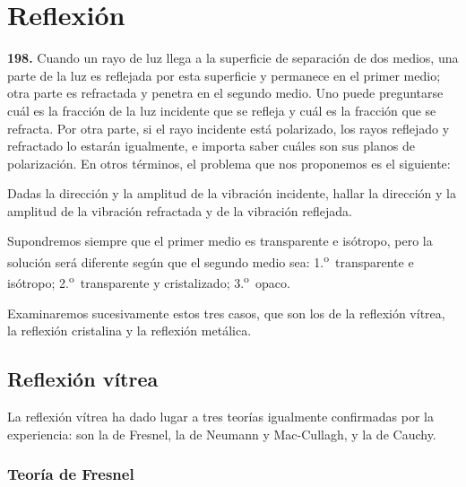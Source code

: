 \chapter{Reflexión}
\label{cap:reflexion}

\noindent\textbf{198.} Cuando un rayo de luz llega a la superficie de
separación de dos medios, una parte de la luz es reflejada por esta
superficie y permanece en el primer medio; otra parte es refractada y
penetra en el segundo medio. Uno puede preguntarse cuál es la fracción de
la luz incidente que se refleja y cuál es la fracción que se refracta. Por
otra parte, si el rayo incidente está polarizado, los rayos reflejado y
refractado lo estarán igualmente, e importa saber cuáles son sus planos de
polarización. En otros términos, el problema que nos proponemos es el
siguiente:

Dadas la dirección y la amplitud de la vibración incidente, hallar la
dirección y la amplitud de la vibración refractada y de la vibración
reflejada.

Supondremos siempre que el primer medio es transparente e isótropo, pero
la solución será diferente según que el segundo medio sea:
1.\textsuperscript{o}~transparente e isótropo; 2.\textsuperscript{o}~transparente y cristalizado;
3.\textsuperscript{o}~opaco.

Examinaremos sucesivamente estos tres casos, que son los de la reflexión
vítrea, la reflexión cristalina y la reflexión metálica.

\section{Reflexión vítrea}

\noindent La reflexión vítrea ha dado lugar a tres teorías igualmente
confirmadas por la experiencia: son la de Fresnel, la de Neumann y
Mac-Cullagh, y la de Cauchy.

\subsection{Teoría de Fresnel}
\label{sec:reflexion-fresnel}

